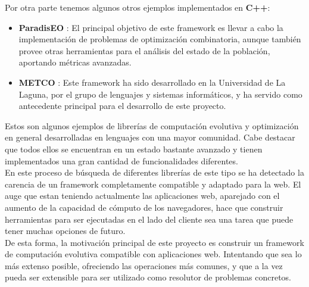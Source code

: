 Por otra parte tenemos algunos otros ejemplos implementados en \textbf{C++}:

\begin{itemize}
    \item \textbf{ParadisEO} \cite{cahon2004paradiseo}: El principal objetivo de este framework es llevar a cabo la implementación de problemas de optimización combinatoria, aunque también provee otras herramientas para el análisis del estado de la población, aportando métricas avanzadas.
    \item \textbf{METCO} \cite{leon2009metco}: Este framework ha sido desarrollado en la Universidad de La Laguna, por el grupo de lenguajes y sistemas informáticos, y ha servido como antecedente principal para el desarrollo de este proyecto.
\end{itemize}

Estos son algunos ejemplos de librerías de computación evolutiva y optimización en general desarrolladas en lenguajes con una mayor comunidad. Cabe destacar que todos ellos se encuentran en un estado bastante avanzado y tienen implementados una gran cantidad de funcionalidades diferentes. \\

En este proceso de búsqueda de diferentes librerías de este tipo se ha detectado la carencia de un framework completamente compatible y adaptado para la web. El auge que estan teniendo actualmente las aplicaciones web, aparejado con el aumento de la capacidad de cómputo de los navegadores, hace que construir herramientas para ser ejecutadas en el lado del cliente sea una tarea que puede tener muchas opciones de futuro. \\

De esta forma, la motivación principal de este proyecto es construir un framework de computación evolutiva compatible con aplicaciones web. Intentando que sea lo más extenso posible, ofreciendo las operaciones más comunes, y que a la vez pueda ser extensible para ser utilizado como resolutor de problemas concretos.